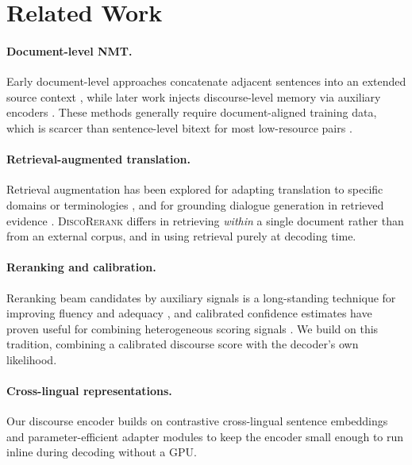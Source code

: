 \section{Related Work}

\paragraph{Document-level NMT.} Early document-level approaches concatenate
adjacent sentences into an extended source context
\citep{tanaka2020span}, while later work injects discourse-level memory
via auxiliary encoders \citep{ferreira2019attention}. These methods generally
require document-aligned training data, which is scarcer than sentence-level
bitext for most low-resource pairs \citep{oyelaran2022lowresource}.

\paragraph{Retrieval-augmented translation.} Retrieval augmentation has been
explored for adapting translation to specific domains or terminologies
\citep{alvarez2023retrieval}, and for grounding dialogue generation in
retrieved evidence \citep{hassan2023dialogue}. \textsc{DiscoRerank} differs
in retrieving \emph{within} a single document rather than from an external
corpus, and in using retrieval purely at decoding time.

\paragraph{Reranking and calibration.} Reranking beam candidates by auxiliary
signals is a long-standing technique for improving fluency and adequacy
\citep{kapoor2022evaluation}, and calibrated confidence estimates have proven
useful for combining heterogeneous scoring signals \citep{ibrahim2023calibration}.
We build on this tradition, combining a calibrated discourse score with the
decoder's own likelihood.

\paragraph{Cross-lingual representations.} Our discourse encoder builds on
contrastive cross-lingual sentence embeddings \citep{park2022contrastive} and
parameter-efficient adapter modules \citep{schneider2020adapter} to keep the
encoder small enough to run inline during decoding without a GPU.
